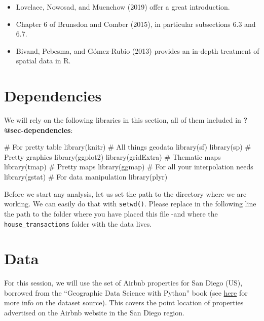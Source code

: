 \documentclass[
  letterpaper,
  krantz2]{style/krantz}
\newenvironment{Shaded}{\begin{snugshade}}{\end{snugshade}}
\newcommand{\CommentTok}[1]{\textcolor[rgb]{0.37,0.37,0.37}{#1}}
\newcommand{\FunctionTok}[1]{\textcolor[rgb]{0.28,0.35,0.67}{#1}}
\newcommand{\NormalTok}[1]{\textcolor[rgb]{0.00,0.23,0.31}{#1}}
\providecommand{\tightlist}{%
  \setlength{\itemsep}{0pt}\setlength{\parskip}{0pt}}\usepackage{longtable,booktabs,array}
\begin{document}
\begin{itemize}
\tightlist
\item
  Lovelace, Nowosad, and Muenchow (2019) offer a great introduction.
\item
  Chapter 6 of Brunsdon and Comber (2015), in particular subsections 6.3
  and 6.7.
\item
  Bivand, Pebesma, and Gómez-Rubio (2013) provides an in-depth treatment
  of spatial data in R.
\end{itemize}

\hypertarget{dependencies-1}{%
\section{Dependencies}\label{dependencies-1}}

We will rely on the following libraries in this section, all of them
included in \textbf{?@sec-dependencies}:

\begin{Shaded}
\begin{Highlighting}[]
\CommentTok{\# For pretty table}
\FunctionTok{library}\NormalTok{(knitr)}
\CommentTok{\# All things geodata}
\FunctionTok{library}\NormalTok{(sf)}
\FunctionTok{library}\NormalTok{(sp)}
\CommentTok{\# Pretty graphics}
\FunctionTok{library}\NormalTok{(ggplot2)}
\FunctionTok{library}\NormalTok{(gridExtra)}
\CommentTok{\# Thematic maps}
\FunctionTok{library}\NormalTok{(tmap)}
\CommentTok{\# Pretty maps}
\FunctionTok{library}\NormalTok{(ggmap)}
\CommentTok{\# For all your interpolation needs}
\FunctionTok{library}\NormalTok{(gstat)}
\CommentTok{\# For data manipulation}
\FunctionTok{library}\NormalTok{(plyr)}
\end{Highlighting}
\end{Shaded}

Before we start any analysis, let us set the path to the directory where
we are working. We can easily do that with \texttt{setwd()}. Please
replace in the following line the path to the folder where you have
placed this file -and where the \texttt{house\_transactions} folder with
the data lives.

\hypertarget{data}{%
\section{Data}\label{data}}

For this session, we will use the set of Airbnb properties for San Diego
(US), borrowed from the ``Geographic Data Science with Python'' book
(see
\href{https://geographicdata.science/book/data/airbnb/regression_cleaning.html}{here}
for more info on the dataset source). This covers the point location of
properties advertised on the Airbnb website in the San Diego region.
\end{document}
